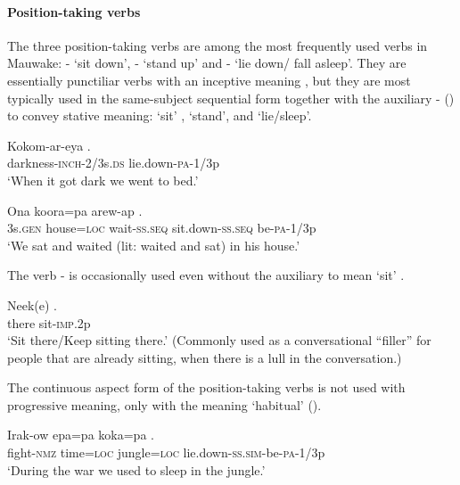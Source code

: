 \paragraph{Position-taking verbs}\label{sec:3.8.4.4.2}
{}
The three position-taking verbs are among the most frequently used verbs in Mauwake: - `sit down', - `stand up' and - `lie down/ fall asleep'. They are essentially punctiliar verbs with an inceptive meaning , but they are most typically used in the same-subject sequential form together with the auxiliary - () to convey stative meaning: `sit' , `stand', and `lie/sleep'.

\ea%
\label{ex:3:x273}
\gll Kokom-ar-eya . \\
darkness-\textsc{inch}-2/3s.\textsc{ds} lie.down-\textsc{pa}-1/3p \\
\glt`When it got dark we went to bed.'
\z

\ea%
\label{ex:3:x274}
\gll Ona koora=pa arew-ap  . \\
3s.\textsc{gen} house=\textsc{loc} wait-\textsc{ss}.\textsc{seq} sit.down-\textsc{ss}.\textsc{seq} be-\textsc{pa}-1/3p\\
\glt`We sat and waited (lit: waited and sat) in his house.'
\z

The verb - is occasionally used even without the auxiliary to mean `sit' . 

\ea%
\label{ex:3:x1824}
\gll Neek(e) . \\
there sit-\textsc{imp}.2p\\
\glt`Sit there/Keep sitting there.' (Commonly used as a conversational ``filler'' for people that are already sitting, when there is a lull in the conversation.)
\z

The continuous aspect form of the position-taking verbs is not used with progressive meaning, only with the meaning `habitual'   (). 

\ea%
\label{ex:3:x275}
\gll Irak-ow epa=pa koka=pa . \\
fight-\textsc{nmz} time=\textsc{loc} jungle=\textsc{loc} lie.down-\textsc{ss}.\textsc{sim}-be-\textsc{pa}-1/3p \\
\glt`During the war we used to sleep in the jungle.'
\z


